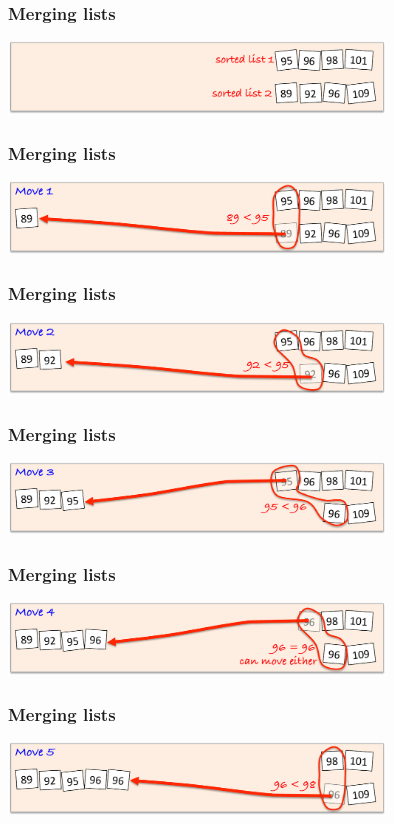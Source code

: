 \documentclass{beamer} %
\begin{document}
\begin{frame}
  \frametitle{Merging lists}
  \centering
  \includegraphics[width=100mm]{assets/merge-move0-crop.pdf}
\end{frame}

\begin{frame}
  \frametitle{Merging lists}
  \centering
  \includegraphics[width=100mm]{assets/merge-move1-crop.pdf}
\end{frame}

\begin{frame}
  \frametitle{Merging lists}
  \centering
  \includegraphics[width=100mm]{assets/merge-move2-crop.pdf}
\end{frame}

\begin{frame}
  \frametitle{Merging lists}
  \centering
  \includegraphics[width=100mm]{assets/merge-move3-crop.pdf}
\end{frame}

\begin{frame}
  \frametitle{Merging lists}
  \centering
  \includegraphics[width=100mm]{assets/merge-move4-crop.pdf}
\end{frame}

\begin{frame}
  \frametitle{Merging lists}
  \centering
  \includegraphics[width=100mm]{assets/merge-move5-crop.pdf}
\end{frame}
\end{document}

